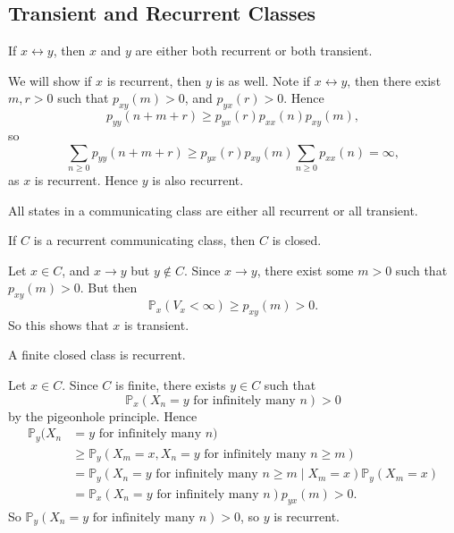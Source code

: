 \documentclass[12pt]{article}
\begin{document}
\subsection{Transient and Recurrent Classes}%
\label{sub:transient_and_recurrent_classes}

\begin{theorem}
	If $x \leftrightarrow y$, then $x$ and $y$ are either both recurrent or both transient.
\end{theorem}

\begin{proofbox}
	We will show if $x$ is recurrent, then $y$ is as well. Note if $x \leftrightarrow y$, then there exist $m, r > 0$ such that $p_{xy}(m) > 0$, and $p_{yx}(r) > 0$. Hence
	\[
		p_{yy}(n + m + r) \geq p_{yx}(r)p_{xx}(n)p_{xy}(m),
	\]
	so
	\[
		\sum_{n \geq 0}p_{yy}(n+m+r) \geq p_{yx}(r)p_{xy}(m) \sum_{n \geq 0}p_{xx}(n) = \infty
	,\]
	as $x$ is recurrent. Hence $y$ is also recurrent.
\end{proofbox}

\begin{corollary}
	All states in a communicating class are either all recurrent or all transient.
\end{corollary}

\begin{theorem}
	If $C$ is a recurrent communicating class, then $C$ is closed.
\end{theorem}

\begin{proofbox} Let $x \in C$, and $x \to y$ but $y \not \in C$. Since $x \to y$, there exist some $m > 0$ such that $p_{xy}(m) > 0$. But then
	\[
		\mathbb{P}_x(V_x < \infty) \geq p_{xy}(m) > 0
	.\]
	So this shows that $x$ is transient.
\end{proofbox}

\begin{theorem}
	A finite closed class is recurrent.
\end{theorem}

\begin{proofbox}
	Let $x \in C$. Since $C$ is finite, there exists $y \in C$ such that
	\[
		\mathbb{P}_x(X_n = y \text{ for infinitely many } n) > 0
	\]
	by the pigeonhole principle. Hence
	\begin{align*}
		\mathbb{P}_y(X_n &= y \text{ for infinitely many } n) \\
				 &\geq \mathbb{P}_y(X_m = x, X_n = y \text{ for infinitely many } n \geq m) \\
								     &= \mathbb{P}_y (X_n = y \text{ for infinitely many } n \geq m \mid X_m = x)\mathbb{P}_y(X_m = x) \\
								     &= \mathbb{P}_x(X_n = y \text{ for infinitely many } n) p_{yx}(m) > 0.
	\end{align*}
	So $\mathbb{P}_y(X_n = y \text{ for infinitely many } n) > 0$, so $y$ is recurrent.
\end{proofbox}
\end{document}
